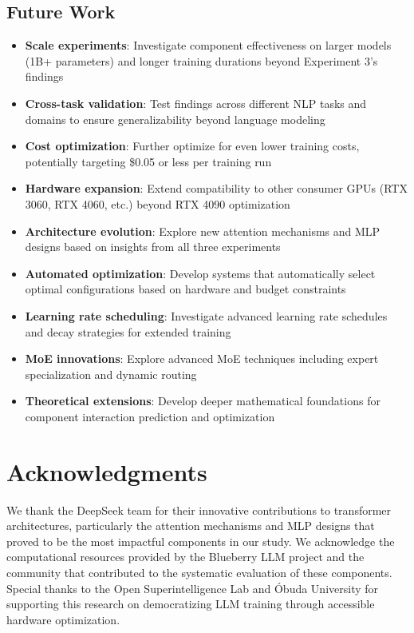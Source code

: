 \documentclass[11pt,a4paper]{article}
\begin{document}
\subsection{Future Work}

\begin{itemize}
    \item \textbf{Scale experiments}: Investigate component effectiveness on larger models (1B+ parameters) and longer training durations beyond Experiment 3's findings
    \item \textbf{Cross-task validation}: Test findings across different NLP tasks and domains to ensure generalizability beyond language modeling
    \item \textbf{Cost optimization}: Further optimize for even lower training costs, potentially targeting \$0.05 or less per training run
    \item \textbf{Hardware expansion}: Extend compatibility to other consumer GPUs (RTX 3060, RTX 4060, etc.) beyond RTX 4090 optimization
    \item \textbf{Architecture evolution}: Explore new attention mechanisms and MLP designs based on insights from all three experiments
    \item \textbf{Automated optimization}: Develop systems that automatically select optimal configurations based on hardware and budget constraints
    \item \textbf{Learning rate scheduling}: Investigate advanced learning rate schedules and decay strategies for extended training
    \item \textbf{MoE innovations}: Explore advanced MoE techniques including expert specialization and dynamic routing
    \item \textbf{Theoretical extensions}: Develop deeper mathematical foundations for component interaction prediction and optimization
\end{itemize}

\section*{Acknowledgments}

We thank the DeepSeek team for their innovative contributions to transformer architectures, particularly the attention mechanisms and MLP designs that proved to be the most impactful components in our study. We acknowledge the computational resources provided by the Blueberry LLM project and the community that contributed to the systematic evaluation of these components. Special thanks to the Open Superintelligence Lab and Óbuda University for supporting this research on democratizing LLM training through accessible hardware optimization.
\end{document}
